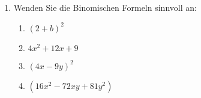 \documentclass{scrartcl}
\begin{document}
	\begin{enumerate}
		\item Wenden Sie die Binomischen Formeln sinnvoll an:
		\begin{enumerate} 
			\item $(2+b)^2$
			\item $4x^2+12x+9$
			\item $(4x -9y)^2$
			\item $(16x^2 -72xy +81y^2)$
		\end{enumerate}
	
		\end{enumerate} 
	
	
\end{document}
